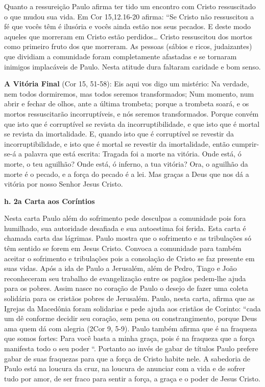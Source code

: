 \documentclass[
]{book}
\begin{document}
Quanto a ressureição Paulo afirma ter tido um encontro com Cristo ressuscitado o que mudou sua vida. Em Cor 15,12.16-20 afirma: ``Se Cristo não ressuscitou a fé que vocês têm é ilusória e vocês ainda estão nos seus pecados. E deste modo aqueles que morreram em Cristo estão perdidos\ldots{} Cristo ressuscitou dos mortos como primeiro fruto dos que morreram. As pessoas (sábios e ricos, judaizantes) que dividiam a comunidade foram completamente afastadas e se tornaram inimigos implacáveis de Paulo. Nesta atitude dura faltaram caridade e bom senso.

\textbf{A Vitória Final} (Cor 15, 51-58): Eis aqui vos digo um mistério: Na verdade, nem todos dormiremos, mas todos seremos transformados; Num momento, num abrir e fechar de olhos, ante a última trombeta; porque a trombeta soará, e os mortos ressuscitarão incorruptíveis, e nós seremos transformados. Porque convém que isto que é corruptível se revista da incorruptibilidade, e que isto que é mortal se revista da imortalidade. E, quando isto que é corruptível se revestir da incorruptibilidade, e isto que é mortal se revestir da imortalidade, então cumprir-se-á a palavra que está escrita: Tragada foi a morte na vitória. Onde está, ó morte, o teu aguilhão? Onde está, ó inferno, a tua vitória? Ora, o aguilhão da morte é o pecado, e a força do pecado é a lei. Mas graças a Deus que nos dá a vitória por nosso Senhor Jesus Cristo.

\textbf{h. 2a Carta aos Coríntios}

Nesta carta Paulo além do sofrimento pede desculpas a comunidade pois fora humilhado, sua autoridade desafiada e sua autoestima foi ferida. Esta carta é chamada carta das lágrimas. Paulo mostra que o sofrimento e as tribulações só têm sentido se forem em Jesus Cristo. Convoca a comunidade para também aceitar o sofrimento e tribulações pois a consolação de Cristo se faz presente em suas vidas. Após a ida de Paulo a Jerusalém, além de Pedro, Tiago e João reconheceram seu trabalho de evangelização entre os pagãos pedem-lhe ajuda para os pobres. Assim nasce no coração de Paulo o desejo de fazer uma coleta solidária para os cristãos pobres de Jerusalém. Paulo, nesta carta, afirma que as Igrejas da Macedônia foram solidarias e pede ajuda aos cristãos de Corinto: ``cada um dê conforme decidir seu coração, sem pena ou constrangimento, porque Deus ama quem dá com alegria (2Cor 9, 5-9). Paulo também afirma que é na fraqueza que somos fortes: Para você basta a minha graça, pois é na fraqueza que a força manifesta todo o seu poder ``. Portanto ao invés de gabar de títulos Paulo prefere gabar de suas fraquezas para que a força de Cristo habite nele. A sabedoria de Paulo está na loucura da cruz, na loucura de anunciar com a vida e de sofrer tudo por amor, de ser fraco para sentir a força, a graça e o poder de Jesus Cristo.
\end{document}

